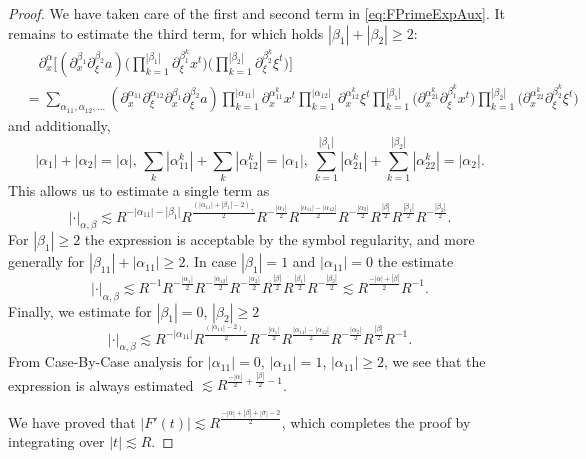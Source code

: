 \documentclass[10pt,a4paper]{amsart}
\begin{document}
\begin{proof}
We have taken care of the first and second term in \eqref{eq:FPrimeExpAux}. It remains to estimate the third term, for which holds $|\beta_1|+|\beta_2| \geq 2$:
\begin{equation*}
    \begin{split}
        &\quad \partial_x^{\alpha} \big[ (\partial_x^{\beta_1} \partial_{\xi}^{\beta_2} a) \big( \prod_{k=1}^{|\beta_1|} \partial_{\xi}^{\beta_1^k} x^t \big) \big( \prod_{k=1}^{|\beta_2|} \partial_{\xi}^{\beta_2^k} \xi^t \big) \big] \\
        &= \sum_{\alpha_{11},\alpha_{12},\ldots} (\partial_x^{\alpha_{11}} \partial_{\xi}^{\alpha_{12}} \partial_x^{\beta_1} \partial_{\xi}^{\beta_2} a) \prod_{k=1}^{|\alpha_{11}|} \partial_x^{\alpha_{11}^k} x^t \prod_{k=1}^{|\alpha_{12}|} \partial_x^{\alpha_{12}^k} \xi^t \prod_{k=1}^{|\beta_1|} (\partial_x^{\alpha_{21}^k} \partial_{\xi}^{\beta_1^k} x^t \big) \prod_{k=1}^{|\beta_2|} \big( \partial_x^{\alpha_{22}^k} \partial_{\xi}^{\beta_2^k} \xi^t \big)
    \end{split}
\end{equation*}
and additionally,
\begin{equation*}
|\alpha_1|+|\alpha_2| = |\alpha|, \, \sum_k|\alpha_{11}^k| + \sum_k |\alpha_{12}^k| = |\alpha_1|, \, \sum_{k=1}^{|\beta_1|} |\alpha_{21}^k| + \sum_{k=1}^{|\beta_2|} |\alpha_{22}^k| = |\alpha_2|.
\end{equation*}
This allows us to estimate a single term as
\begin{equation*}
    |\cdot|_{\alpha,\beta} \lesssim R^{-|\alpha_{11}|-|\beta_1|} R^{\frac{(|\alpha_{11}|+|\beta_1|-2)_+}{2}} R^{-\frac{|\alpha_1|}{2}} R^{\frac{|\alpha_{11}|-|\alpha_{12}|}{2}} R^{-\frac{|\alpha_2|}{2}} R^{\frac{|\beta|}{2}} R^{\frac{|\beta_1|}{2}} R^{-\frac{|\beta_2|}{2}}.
\end{equation*}
For $|\beta_1| \geq 2$ the expression is acceptable by the symbol regularity, and more generally for $|\beta_{11}|+|\alpha_{11}| \geq 2$. In case $|\beta_1| = 1$ and $|\alpha_{11}| = 0$ the estimate
\begin{equation*}
     |\cdot|_{\alpha,\beta} \lesssim R^{-1} R^{-\frac{|\alpha_1|}{2}} R^{-\frac{|\alpha_{12}|}{2}} R^{-\frac{|\alpha_2|}{2}} R^{\frac{|\beta|}{2}} R^{\frac{|\beta_1|}{2}} R^{-\frac{|\beta_2|}{2}} \lesssim R^{\frac{-|\alpha|+|\beta|}{2}} R^{-1}.
\end{equation*}
Finally, we estimate for $|\beta_1|=0$, $|\beta_2| \geq 2$
\begin{equation*}
    |\cdot|_{\alpha,\beta} \lesssim R^{-|\alpha_{11}|} R^{\frac{(|\alpha_{11}|-2)_+}{2}} R^{-\frac{|\alpha_1|}{2}} R^{\frac{|\alpha_{11}|-|\alpha_{12}|}{2}} R^{-\frac{|\alpha_2|}{2}} R^{\frac{|\beta|}{2}} R^{-1}.
\end{equation*}
From Case-By-Case analysis for $|\alpha_{11}|=0$, $|\alpha_{11}| = 1$, $|\alpha_{11}| \geq 2$, we see that the expression is always estimated $\lesssim R^{\frac{-|\alpha|}{2}+\frac{|\beta|}{2}-1}$.

\smallskip

We have proved that $|F'(t)| \lesssim R^{\frac{-|\alpha| + |\beta| + |\sigma|-2}{2}}$,
which completes the proof by integrating over $|t| \lesssim R$.
\end{proof}
\end{document}

